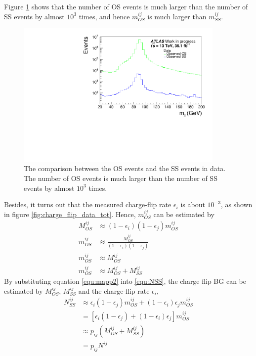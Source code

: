 Figure \ref{fig:charge_flip_OS_SS} shows that the number of OS events is much larger than the number of SS events by almost $10^3$ times, and hence $m^{ij}_{OS}$ is much larger than $m^{ij}_{SS}$.
\begin{figure}
\centering
\includegraphics[width=0.9\textwidth]{data/plot/charge_flip/ReweightPlots/plots_NOchfSF/data_mll_unweighted.pdf}
\caption{The comparison between the OS events and the SS events in data. The number of OS events is much larger than the number of SS events by almost $10^3$ times.}
\label{fig:charge_flip_OS_SS}
\end{figure}
Besides, it turns out that the measured charge-flip rate $\epsilon_i$ is about $10^{-3}$, as shown in figure \ref{fig:charge_flip_data_tot}.
Hence, $m^{ij}_{OS}$ can be estimated by
\begin{align}
M^{ij}_{OS} &\approx (1-\epsilon_i) (1-\epsilon_j) m^{ij}_{OS} \\
m^{ij}_{OS} &\approx \frac{ M^{ij}_{OS} }{ (1-\epsilon_i) (1-\epsilon_j) }
\label{equ:mapp1} \\
m^{ij}_{OS} &\approx M^{ij}_{OS} \\
m^{ij}_{OS} &\approx M^{ij}_{OS} + M^{ij}_{SS}
\label{equ:mapp2}
\end{align}
By substituting equation \ref{equ:mapp2} into \ref{equ:NSS}, the charge flip BG can be estimated by $M^{ij}_{OS}$, $M^{ij}_{SS}$ and the charge-flip rate $\epsilon_i$,
\begin{align}
N^{ij}_{SS} &\approx \epsilon_i (1-\epsilon_j) m^{ij}_{OS} + (1-\epsilon_i) \epsilon_j m^{ij}_{OS} \\
&= [ \epsilon_i (1-\epsilon_j) + (1-\epsilon_i) \epsilon_j ] m^{ij}_{OS} \label{equ:NSS3}\\
&\approx p_{ij} (M^{ij}_{OS} + M^{ij}_{SS}) \\
&=p_{ij} N^{ij}
\label{equ:NSS2}
\end{align}
